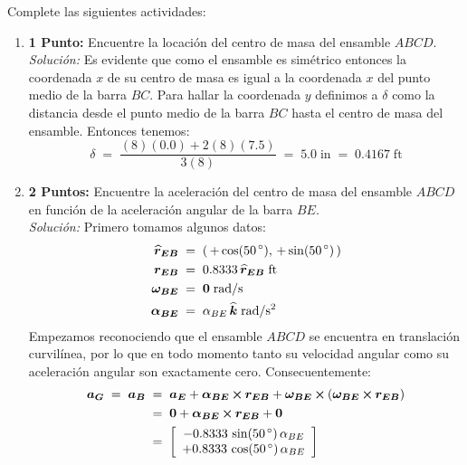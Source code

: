 \documentclass[ a4paper, twoside, 11pt]{article}
\begin{document}
\begin{problem}
Complete las siguientes actividades: 
\begin{enumerate}[label=\textbf{\alph*)}]
\item \textbf{1 Punto:} Encuentre la locaci\'on del centro de masa del ensamble $ABCD$. \\[1ex] \emph{Soluci\'on:} Es evidente que como el ensamble es sim\'etrico entonces la coordenada $x$ de su centro de masa es igual a la coordenada $x$ del punto medio de la barra $BC$. Para hallar la coordenada $y$ definimos a $\delta$ como la distancia desde el punto medio de la barra $BC$ hasta el centro de masa del ensamble. Entonces tenemos:
\[
\delta \; = \; 
\frac{(8)(0.0) + 2(8)(7.5)}{3(8)} \; = \; 5.0 \; \text{in}
\; = \; 0.4167 \; \text{ft}
\]
\item \textbf{2 Puntos:} Encuentre la aceleraci\'on del centro de masa del ensamble $ABCD$ en funci\'on de la aceleraci\'on angular de la barra $BE$. \\[1ex]
\emph{Soluci\'on:} Primero tomamos algunos datos: 
\begin{align*}
{\boldsymbol{\widehat{r}_{EB}}} \;
& = \; ( \, +\cos(50^{\,\circ}), \, +\sin(50^{\,\circ}) \, ) \\
{\boldsymbol{r_{EB}}} \;
& = \; 0.8333 \, {\boldsymbol{\widehat{r}_{EB}}} \; \text{ft} \\
{\boldsymbol{\omega_{BE}}} \; & = \; {\boldsymbol{0}} \; \text{rad/s} \\
{\boldsymbol{\alpha_{BE}}} \; & = \; \alpha_{BE} \, {\boldsymbol{\widehat{k}}} \; \text{rad/s\ensuremath{^{\text{2}}}}
\end{align*}
Empezamos reconociendo que el ensamble $ABCD$ se encuentra en translaci\'on curvil\'inea, por lo que en todo momento tanto su velocidad angular como su aceleraci\'on angular son exactamente cero. Consecuentemente: 
\begin{align*}
{\boldsymbol{a_G}} \; = \; {\boldsymbol{a_B}} \; 
& = \; {\boldsymbol{a_E}} + {\boldsymbol{\alpha_{BE}}} \,{\boldsymbol{\times}}\, {\boldsymbol{r_{EB}}} + {\boldsymbol{\omega_{BE}}} \,{\boldsymbol{\times}}\, ( {\boldsymbol{\omega_{BE}}} \,{\boldsymbol{\times}}\, {\boldsymbol{r_{EB}}} ) \\
& = \; {\boldsymbol{0}} + {\boldsymbol{\alpha_{BE}}} \,{\boldsymbol{\times}}\, {\boldsymbol{r_{EB}}} + {\boldsymbol{0}} \\
& = \; \left[ \begin{array}{c}  -0.8333 \, \sin(50^{\,\circ}) \, \alpha_{BE} \\  +0.8333 \, \cos(50^{\,\circ}) \, \alpha_{BE} \end{array} \right]
\end{align*}


\end{enumerate}
\end{problem}
\end{document}
